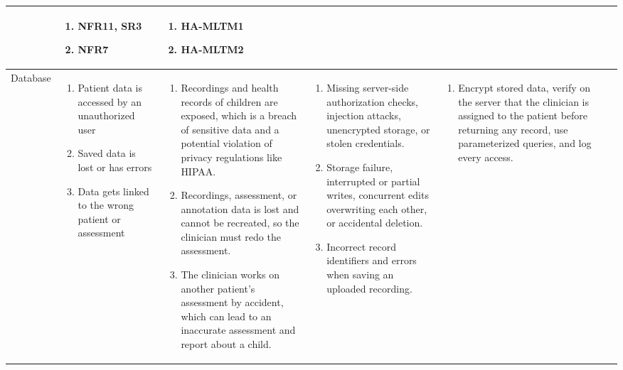 \documentclass{article}
\begin{document}
\begin{landscape}
\begin{longtable}{|p{2.4cm}|p{3.2cm}|p{4cm}|p{3.6cm}|p{4.8cm}|p{1.8cm}|p{2.2cm}|}
\begin{enumerate}[leftmargin=*]
  \end{enumerate} &
  \begin{enumerate}[leftmargin=*]
       \item NFR11, SR3
       \item NFR7
  \end{enumerate} &
  \begin{enumerate}[leftmargin=*]
       \item HA-MLTM1
       \item HA-MLTM2
  \end{enumerate} \\
  \hline
  Database &
  \begin{enumerate}[leftmargin=*]
      \item Patient data is accessed by an unauthorized user
      \item Saved data is lost or has errors
      \item Data gets linked to the wrong patient or assessment
  \end{enumerate} &
  \begin{enumerate}[leftmargin=*]
      \item Recordings and health records of children are exposed, which is a breach of sensitive data and a potential violation of privacy regulations like HIPAA.
      \item Recordings, assessment, or annotation data is lost and cannot be recreated, so the clinician must redo the assessment.
      \item The clinician works on another patient's assessment by accident, which can lead to an inaccurate assessment and report about a child.
  \end{enumerate} &
  \begin{enumerate}[leftmargin=*]
       \item Missing server-side authorization checks, injection attacks, unencrypted storage, or stolen credentials.
       \item Storage failure, interrupted or partial writes, concurrent edits overwriting each other, or accidental deletion.
       \item Incorrect record identifiers and errors when saving an uploaded recording.
  \end{enumerate} &
  \begin{enumerate}[leftmargin=*]
       \item Encrypt stored data, verify on the server that the clinician is assigned to the patient before returning any record, use parameterized queries, and log every access.

\end{enumerate}
\end{longtable}
\end{landscape}
\end{document}
